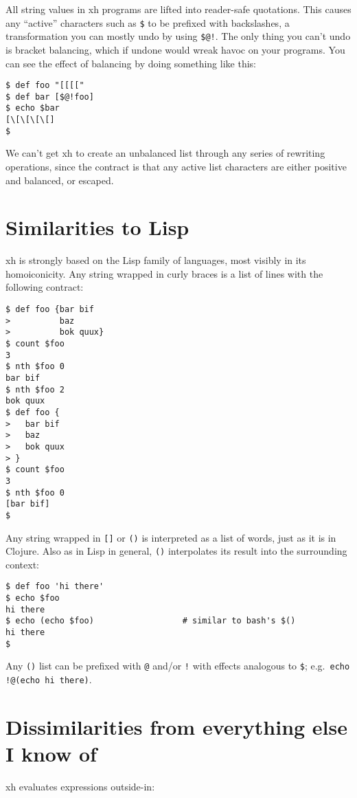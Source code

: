 \documentclass{report}
\begin{document}
  All string values in xh programs are lifted into reader-safe quotations. This
  causes any ``active'' characters such as \verb|$| to be prefixed with
  backslashes, a transformation you can mostly undo by using \verb|$@!|. The
  only thing you can't undo is bracket balancing, which if undone would wreak
  havoc on your programs. You can see the effect of balancing by doing
  something like this:

\begin{verbatim}
$ def foo "[[[["
$ def bar [$@!foo]
$ echo $bar
[\[\[\[\[]
$
\end{verbatim}

  We can't get xh to create an unbalanced list through any series of rewriting
  operations, since the contract is that any active list characters are either
  positive and balanced, or escaped.

\chapter{Similarities to Lisp}\label{chp:similarities-to-lisp}
  xh is strongly based on the Lisp family of languages, most visibly in its
  homoiconicity. Any string wrapped in curly braces is a list of lines with the
  following contract:

\begin{verbatim}
$ def foo {bar bif
>          baz
>          bok quux}
$ count $foo
3
$ nth $foo 0
bar bif
$ nth $foo 2
bok quux
$ def foo {
>   bar bif
>   baz
>   bok quux
> }
$ count $foo
3
$ nth $foo 0
[bar bif]
$
\end{verbatim}

  Any string wrapped in \verb|[]| or \verb|()| is interpreted as a list of
  words, just as it is in Clojure. Also as in Lisp in general, \verb|()|
  interpolates its result into the surrounding context:

\begin{verbatim}
$ def foo 'hi there'
$ echo $foo
hi there
$ echo (echo $foo)                  # similar to bash's $()
hi there
$
\end{verbatim}

  Any \verb|()| list can be prefixed with \verb|@| and/or \verb|!| with effects
  analogous to \verb|$|; e.g.~\verb|echo !@(echo hi there)|.

\chapter{Dissimilarities from everything else I know of}\label{chp:dissimilarities}
  xh evaluates expressions outside-in:
\end{document}
